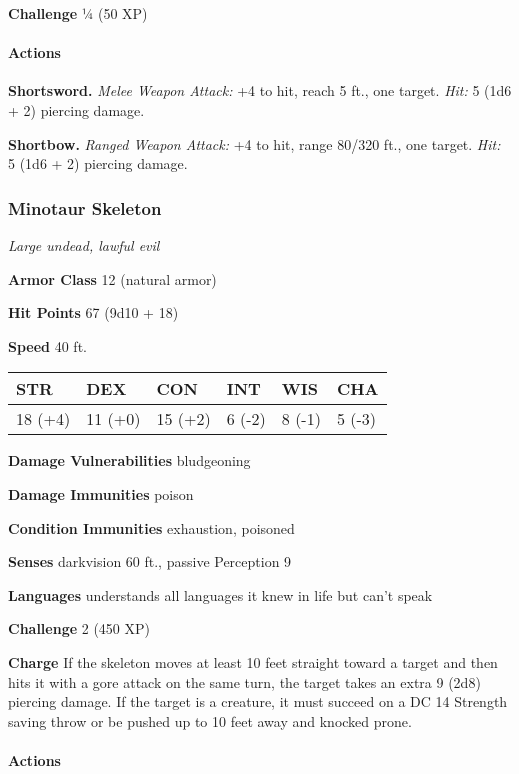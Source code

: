 \documentclass[
]{article}
\begin{document}
\textbf{Challenge} ¼ (50 XP)

\hypertarget{actions-6}{%
\paragraph{Actions}\label{actions-6}}

\textbf{Shortsword.} \emph{Melee Weapon Attack:} +4 to hit, reach 5 ft.,
one target. \emph{Hit:} 5 (1d6 + 2) piercing damage.

\textbf{Shortbow.} \emph{Ranged Weapon Attack:} +4 to hit, range 80/320
ft., one target. \emph{Hit:} 5 (1d6 + 2) piercing damage.

\hypertarget{minotaur-skeleton}{%
\subsubsection{Minotaur Skeleton}\label{minotaur-skeleton}}

\emph{Large undead, lawful evil}

\textbf{Armor Class} 12 (natural armor)

\textbf{Hit Points} 67 (9d10 + 18)

\textbf{Speed} 40 ft.

\begin{longtable}[]{@{}llllll@{}}
\toprule
STR & DEX & CON & INT & WIS & CHA\tabularnewline
\midrule
\endhead
18 (+4) & 11 (+0) & 15 (+2) & 6 (-2) & 8 (-1) & 5 (-3)\tabularnewline
\bottomrule
\end{longtable}

\textbf{Damage Vulnerabilities} bludgeoning

\textbf{Damage Immunities} poison

\textbf{Condition Immunities} exhaustion, poisoned

\textbf{Senses} darkvision 60 ft., passive Perception 9

\textbf{Languages} understands all languages it knew in life but can't
speak

\textbf{Challenge} 2 (450 XP)

\textbf{Charge} If the skeleton moves at least 10 feet straight toward a
target and then hits it with a gore attack on the same turn, the target
takes an extra 9 (2d8) piercing damage. If the target is a creature, it
must succeed on a DC 14 Strength saving throw or be pushed up to 10 feet
away and knocked prone.

\hypertarget{actions-7}{%
\paragraph{Actions}\label{actions-7}}
\end{document}
